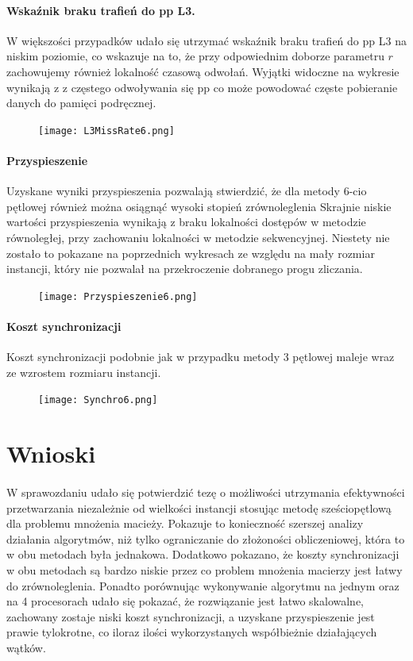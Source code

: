 \documentclass{scrartcl}
\begin{document}
\newpage
\paragraph{Wskaźnik braku trafień do pp L3.} W większości przypadków udało się utrzymać wskaźnik braku trafień do pp L3 na niskim poziomie, co wskazuje na to, że przy odpowiednim doborze parametru $r$ zachowujemy również lokalność czasową odwołań. Wyjątki widoczne na wykresie wynikają z  z częstego odwoływania się pp co może powodować częste pobieranie danych do pamięci podręcznej.
\begin{figure}[H]
\texttt{[image: L3MissRate6.png]}
\end{figure}

\newpage
\paragraph{Przyspieszenie} Uzyskane wyniki przyspieszenia pozwalają stwierdzić, że dla metody 6-cio pętlowej również można osiągnąć wysoki stopień zrównoleglenia Skrajnie niskie wartości przyspieszenia wynikają z braku lokalności dostępów w metodzie równoległej, przy zachowaniu lokalności w metodzie sekwencyjnej. Niestety nie zostało to pokazane na poprzednich wykresach ze względu na mały rozmiar instancji, który nie pozwalał na przekroczenie dobranego progu zliczania.
\begin{figure}[H]
\texttt{[image: Przyspieszenie6.png]}
\end{figure}

\newpage
\paragraph{Koszt synchronizacji} Koszt synchronizacji podobnie jak w przypadku metody 3 pętlowej maleje wraz ze wzrostem rozmiaru instancji.
\begin{figure}[H]
\texttt{[image: Synchro6.png]}
\end{figure}

\section{Wnioski}
\paragraph{} W sprawozdaniu udało się potwierdzić tezę o możliwości utrzymania efektywności przetwarzania niezależnie od wielkości instancji stosując metodę sześciopętlową dla problemu mnożenia macieży. Pokazuje to konieczność szerszej analizy działania algorytmów, niż tylko ograniczanie do złożoności obliczeniowej, która to w obu metodach była jednakowa. Dodatkowo pokazano, że koszty synchronizacji w obu metodach są bardzo niskie przez co problem mnożenia macierzy jest łatwy do zrównoleglenia. Ponadto porównując wykonywanie algorytmu na jednym oraz na 4 procesorach udało się pokazać, że rozwiązanie jest łatwo skalowalne, zachowany zostaje niski koszt synchronizacji, a uzyskane przyspieszenie jest prawie tylokrotne, co iloraz ilości wykorzystanych współbieżnie działających wątków. 
\end{document}
